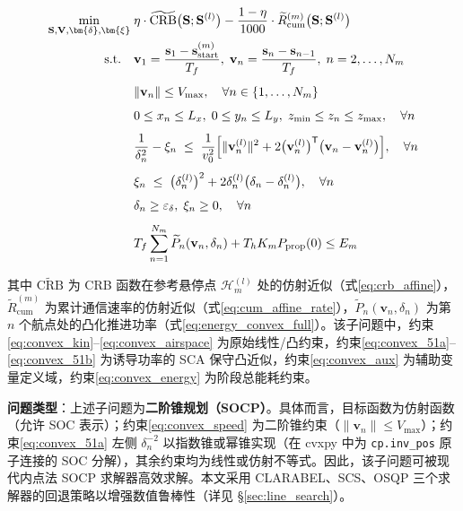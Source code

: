 \begin{framed}
\begin{align}
\min_{\mathbf{S},\mathbf{V},\bm{\delta},\bm{\xi}}\;&
\eta\cdot\widetilde{\mathrm{CRB}}\bigl(\mathbf{S};\mathbf{S}^{(l)}\bigr)
-\frac{1-\eta}{1000}\cdot\widetilde{R}_{\mathrm{cum}}^{(m)}\bigl(\mathbf{S};\mathbf{S}^{(l)}\bigr)
\label{eq:convex_obj}\\
\text{s.t.}\quad
&\mathbf{v}_1=\frac{\mathbf{s}_1-\mathbf{s}_{\mathrm{start}}^{(m)}}{T_f},\;
\mathbf{v}_n=\frac{\mathbf{s}_n-\mathbf{s}_{n-1}}{T_f},\; n=2,\ldots,N_m
\label{eq:convex_kin}\\[4pt]
&\|\mathbf{v}_n\|\leq V_{\max},\quad\forall n\in\{1,\ldots,N_m\}
\label{eq:convex_speed}\\[4pt]
&0\leq x_n\leq L_x,\;0\leq y_n\leq L_y,\;z_{\min}\leq z_n\leq z_{\max},\quad\forall n
\label{eq:convex_airspace}\\[4pt]
&\frac{1}{\delta_n^2}-\xi_n\;\leq\;
\frac{1}{v_0^2}\Bigl[\|\mathbf{v}_n^{(l)}\|^2+
2\bigl(\mathbf{v}_n^{(l)}\bigr)^{\mathsf{T}}\bigl(\mathbf{v}_n-\mathbf{v}_n^{(l)}\bigr)\Bigr],\quad\forall n
\label{eq:convex_51a}\\[4pt]
&\xi_n\;\leq\;\bigl(\delta_n^{(l)}\bigr)^2+
2\delta_n^{(l)}\bigl(\delta_n-\delta_n^{(l)}\bigr),\quad\forall n
\label{eq:convex_51b}\\[4pt]
&\delta_n\geq\varepsilon_{\delta},\;\xi_n\geq 0,\quad\forall n
\label{eq:convex_aux}\\[4pt]
&T_f\sum_{n=1}^{N_m}\widetilde{P}_n(\mathbf{v}_n,\delta_n)+
T_h K_m P_{\mathrm{prop}}(0)\leq E_m
\label{eq:convex_energy}
\end{align}
\end{framed}

其中 $\widetilde{\mathrm{CRB}}$ 为 CRB 函数在参考悬停点 $\mathcal{H}_m^{(l)}$ 处的仿射近似（式\eqref{eq:crb_affine}），$\widetilde{R}_{\mathrm{cum}}^{(m)}$ 为累计通信速率的仿射近似（式\eqref{eq:cum_affine_rate}），$\widetilde{P}_n(\mathbf{v}_n,\delta_n)$ 为第 $n$ 个航点处的凸化推进功率（式\eqref{eq:energy_convex_full}）。该子问题中，约束\eqref{eq:convex_kin}--\eqref{eq:convex_airspace} 为原始线性/凸约束，约束\eqref{eq:convex_51a}--\eqref{eq:convex_51b} 为诱导功率的 SCA 保守凸近似，约束\eqref{eq:convex_aux} 为辅助变量定义域，约束\eqref{eq:convex_energy} 为阶段总能耗约束。

\textbf{问题类型}：上述子问题为\textbf{二阶锥规划（SOCP）}。具体而言，目标函数为仿射函数（允许 SOC 表示）；约束\eqref{eq:convex_speed} 为二阶锥约束（$\|\mathbf{v}_n\|\leq V_{\max}$）；约束\eqref{eq:convex_51a} 左侧 $\delta_n^{-2}$ 以指数锥或幂锥实现（在 cvxpy 中为 \texttt{cp.inv\_pos} 原子连接的 SOC 分解），其余约束均为线性或仿射不等式。因此，该子问题可被现代内点法 SOCP 求解器高效求解。本文采用 CLARABEL、SCS、OSQP 三个求解器的回退策略以增强数值鲁棒性（详见 \S\ref{sec:line_search}）。

